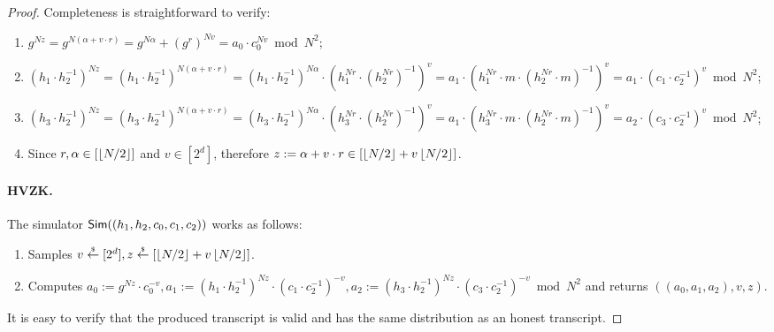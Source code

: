\begin{proof} 
Completeness is straightforward to verify:
\begin{enumerate}
\item $g^{Nz} = g^{N(\alpha + v \cdot r)} = g^{N\alpha} + (g^r)^{Nv} = a_0 \cdot c_0^{Nv} \bmod N^2$;
\item $(h_1\cdot h_2^{-1})^{Nz} = (h_1\cdot h_2^{-1})^{N(\alpha + v \cdot r)} = (h_1\cdot h_2^{-1})^{N\alpha} \cdot (h_1^{Nr}\cdot (h_2^{Nr})^{-1})^v = a_1 \cdot (h_1^{Nr} \cdot m \cdot (h_2^{Nr} \cdot m)^{-1})^v = a_1 \cdot (c_1\cdot c_2^{-1})^v \bmod N^2$;
\item $(h_3\cdot h_2^{-1})^{Nz} = (h_3\cdot h_2^{-1})^{N(\alpha + v \cdot r)} = (h_3\cdot h_2^{-1})^{N\alpha} \cdot (h_3^{Nr}\cdot (h_2^{Nr})^{-1})^v = a_1 \cdot (h_3^{Nr} \cdot m \cdot (h_2^{Nr} \cdot m)^{-1})^v = a_2 \cdot (c_3\cdot c_2^{-1})^v \bmod N^2$;
\item Since $r, \alpha \in [\left\lfloor N/2 \right\rfloor]$ and $v \in [2^d]$, therefore $z:= \alpha + v \cdot r \in [\left\lfloor N/2 \right\rfloor + v\left\lfloor N/2 \right\rfloor]$. 
\end{enumerate}

\paragraph{HVZK.} The simulator $\mathsf{Sim}((h_1, h_2, c_0, c_1, c_2))$ works as follows:
\begin{enumerate}
\item Samples $v \stackrel{{\scriptscriptstyle\$}}{\leftarrow} [2^d], z \stackrel{{\scriptscriptstyle\$}}{\leftarrow} [\left\lfloor N/2 \right\rfloor + v\left\lfloor N/2 \right\rfloor]$.
\item Computes $a_0:= g^{Nz} \cdot c_0^{-v}, a_1:= (h_1 \cdot h_2^{-1})^{Nz} \cdot (c_1 \cdot c_2^{-1})^{-v}, a_2:= (h_3 \cdot h_2^{-1})^{Nz} \cdot (c_3 \cdot c_2^{-1})^{-v} \bmod N^2$ and returns $((a_0, a_1, a_2), v, z)$.
\end{enumerate}
It is easy to verify that the produced transcript is valid and has the same distribution as an honest transcript. 



\end{proof}
